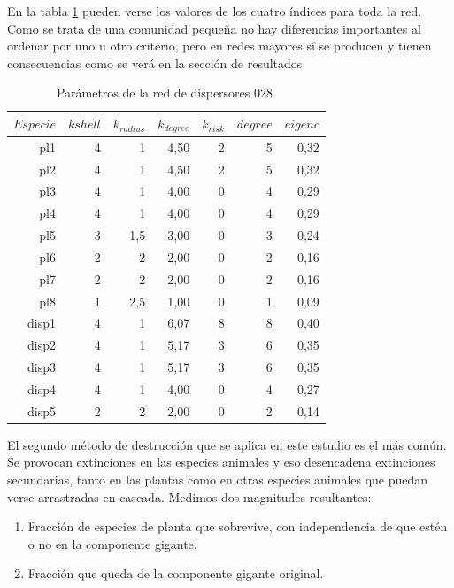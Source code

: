 En la tabla \ref{tab:pars_SD_028} pueden verse los valores de los cuatro índices para toda la red. Como se trata de una comunidad pequeña no hay diferencias importantes
al ordenar por uno u otro criterio, pero en redes mayores sí se producen y tienen consecuencias como se verá en la sección de resultados

\begin{table}[htbp]
  \centering
  \small
    \begin{tabular}{rrrrrrr}
    \toprule
    $Especie$ & $k shell$ & ${k}_{radius}$ & ${k}_{degree}$ & ${k}_{risk}$ & $degree$ & $eigenc$ \\
\midrule
    pl1  & 4    & 1    & 4,50 & 2    & 5    & 0,32 \\
    pl2  & 4    & 1    & 4,50 & 2    & 5    & 0,32 \\
    pl3  & 4    & 1    & 4,00 & 0    & 4    & 0,29 \\
    pl4  & 4    & 1    & 4,00 & 0    & 4    & 0,29 \\
    pl5  & 3    & 1,5  & 3,00 & 0    & 3    & 0,24 \\
    pl6  & 2    & 2    & 2,00 & 0    & 2    & 0,16 \\
    pl7  & 2    & 2    & 2,00 & 0    & 2    & 0,16 \\
    pl8  & 1    & 2,5  & 1,00 & 0    & 1    & 0,09 \\
    disp1 & 4    & 1    & 6,07 & 8    & 8    & 0,40 \\
    disp2 & 4    & 1    & 5,17 & 3    & 6    & 0,35 \\
    disp3 & 4    & 1    & 5,17 & 3    & 6    & 0,35 \\
    disp4 & 4    & 1    & 4,00 & 0    & 4    & 0,27 \\
    disp5 & 2    & 2    & 2,00 & 0    & 2    & 0,14 \\
    \bottomrule
    \end{tabular}%
    \caption{Parámetros de la red de dispersores $028$.}
  \label{tab:pars_SD_028}%
\end{table}%

El segundo método de destrucción que se aplica en este estudio es el más común. Se provocan extinciones en las especies animales y eso desencadena extinciones secundarias, tanto
en las plantas como en otras especies animales que puedan verse arrastradas en cascada. Medimos dos magnitudes resultantes:

\begin{enumerate}
\item Fracción de especies de planta que sobrevive, con independencia de que estén o no en la componente gigante.
\item Fracción que queda de la componente gigante original.
\end{enumerate}

